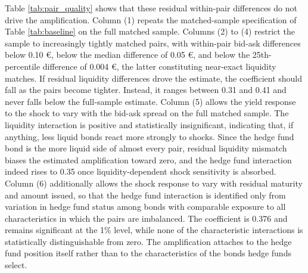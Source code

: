 \documentclass[english, 11pt, oneside]{article}
\begin{document}
Table \ref{tab:pair_quality} shows that these residual within-pair differences do not drive the amplification. Column (1) repeats the matched-sample specification of Table \ref{tab:baseline} on the full matched sample. Columns (2) to (4) restrict the sample to increasingly tightly matched pairs, with within-pair bid-ask differences below 0.10 \euro, below the median difference of 0.05 \euro, and below the 25th-percentile difference of 0.004 \euro, the latter constituting near-exact liquidity matches. If residual liquidity differences drove the estimate, the coefficient should fall as the pairs become tighter. Instead, it ranges between 0.31 and 0.41 and never falls below the full-sample estimate. Column (5) allows the yield response to the shock to vary with the bid-ask spread on the full matched sample. The liquidity interaction is positive and statistically insignificant, indicating that, if anything, less liquid bonds react more strongly to shocks. Since the hedge fund bond is the more liquid side of almost every pair, residual liquidity mismatch biases the estimated amplification toward zero, and the hedge fund interaction indeed rises to 0.35 once liquidity-dependent shock sensitivity is absorbed. Column (6) additionally allows the shock response to vary with residual maturity and amount issued, so that the hedge fund interaction is identified only from variation in hedge fund status among bonds with comparable exposure to all characteristics in which the pairs are imbalanced. The coefficient is 0.376 and remains significant at the 1\% level, while none of the characteristic interactions is statistically distinguishable from zero. The amplification attaches to the hedge fund position itself rather than to the characteristics of the bonds hedge funds select. \\
\end{document}

